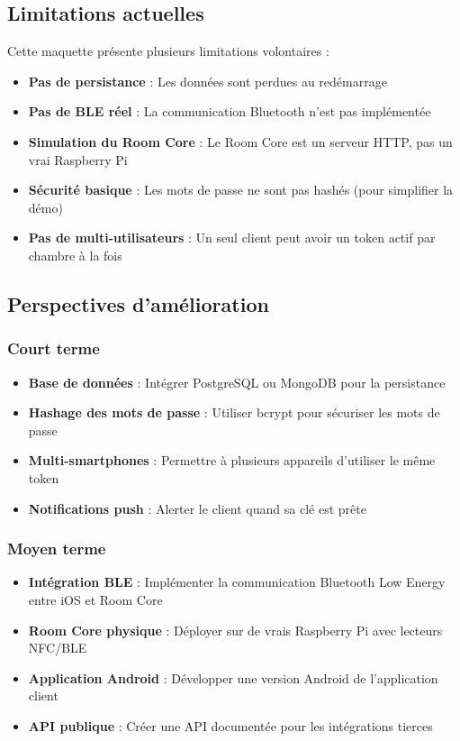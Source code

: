 \documentclass[11pt,a4paper]{article}
\begin{document}
\subsection{Limitations actuelles}

Cette maquette présente plusieurs limitations volontaires :

\begin{itemize}
    \item \textbf{Pas de persistance} : Les données sont perdues au redémarrage
    \item \textbf{Pas de BLE réel} : La communication Bluetooth n'est pas implémentée
    \item \textbf{Simulation du Room Core} : Le Room Core est un serveur HTTP, pas un vrai Raspberry Pi
    \item \textbf{Sécurité basique} : Les mots de passe ne sont pas hashés (pour simplifier la démo)
    \item \textbf{Pas de multi-utilisateurs} : Un seul client peut avoir un token actif par chambre à la fois
\end{itemize}

\subsection{Perspectives d'amélioration}

\subsubsection{Court terme}

\begin{itemize}
    \item \textbf{Base de données} : Intégrer PostgreSQL ou MongoDB pour la persistance
    \item \textbf{Hashage des mots de passe} : Utiliser bcrypt pour sécuriser les mots de passe
    \item \textbf{Multi-smartphones} : Permettre à plusieurs appareils d'utiliser le même token
    \item \textbf{Notifications push} : Alerter le client quand sa clé est prête
\end{itemize}

\subsubsection{Moyen terme}

\begin{itemize}
    \item \textbf{Intégration BLE} : Implémenter la communication Bluetooth Low Energy entre iOS et Room Core
    \item \textbf{Room Core physique} : Déployer sur de vrais Raspberry Pi avec lecteurs NFC/BLE
    \item \textbf{Application Android} : Développer une version Android de l'application client
    \item \textbf{API publique} : Créer une API documentée pour les intégrations tierces
\end{itemize}
\end{document}
